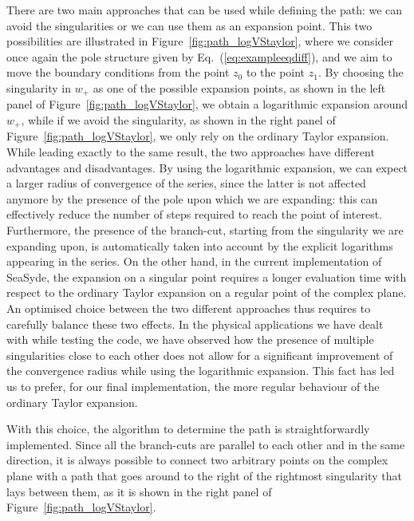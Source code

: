 \documentclass[final,1p,times]{elsarticle}
\begin{document}
There are two main approaches that can be used while defining the path: we can avoid the singularities or we can use them as an expansion point.
This two possibilities are illustrated in Figure~\ref{fig:path_logVStaylor}, where we consider once again the pole structure given by Eq.~(\ref{eq:exampleeqdiff}), and we aim to move the boundary conditions from the point $z_0$ to the point $z_1$.
By choosing the singularity in $w_+$ as one of the possible expansion points, as shown in the left panel of Figure~\ref{fig:path_logVStaylor}, we obtain a logarithmic expansion around $w_+$, while if we avoid the singularity, as shown in the right panel of Figure~\ref{fig:path_logVStaylor}, we only rely on the ordinary Taylor expansion.
While leading exactly to the same result, the two approaches have different advantages and disadvantages.
By using the logarithmic expansion, we can expect a larger radius of convergence of the series, since the latter is not affected anymore by the presence of the pole upon which we are expanding: this can effectively reduce the number of steps required to reach the point of interest.
Furthermore, the presence of the branch-cut, starting from the singularity we are expanding upon, is automatically taken into account by the explicit logarithms appearing in the series.
On the other hand, in the current implementation of {\sc SeaSyde}, the expansion on a singular point requires a longer evaluation time with respect to the ordinary Taylor expansion on a regular point of the complex plane.
An optimised choice between the two different approaches thus requires to carefully balance these two effects.
In the physical applications we have dealt with while testing the code, we have observed how the presence of multiple singularities close to each other does not allow for a significant improvement of the convergence radius while using the logarithmic expansion. This fact has led us to prefer, for our final implementation, the more regular behaviour of the ordinary Taylor expansion.

With this choice, the algorithm to determine the path is straightforwardly implemented.
Since all the branch-cuts are parallel to each other and in the same direction, it is always possible to connect two arbitrary points on the complex plane with a path that goes around to the right of the rightmost singularity that lays between them, as it is shown in the right panel of Figure~\ref{fig:path_logVStaylor}. 
\end{document}
